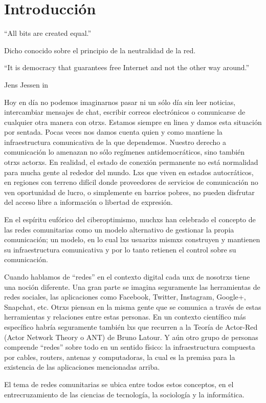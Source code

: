 \section{Introducción}

\epigraph{``All bits are created equal.''}{Dicho conocido sobre el principio de la neutralidad de la red.}
\epigraph{``It is democracy that guarantees free Internet and not the other way around.''}{Jens Jessen in~\autocite{Rieder2012}}

Hoy en día no podemos imaginarnos pasar ni un sólo día sin leer noticias, intercambiar mensajes de chat, escribir correos electrónicos o comunicarse de cualquier otra manera con otrxs.
Estamos siempre en linea y damos esta situación por sentada.
Pocas veces nos damos cuenta quien y como mantiene la infraestructura comunicativa de la que dependemos.
Nuestro derecho a comunicación lo amenazan no sólo regímenes antidemocráticos, sino también otrxs actorxs.
En realidad, el estado de conexión permanente no está normalidad para mucha gente al rededor del mundo.
Lxs que viven en estados autocráticos, en regiones con terreno difícil donde proveedores de servicios de comunicación no ven oportunidad de lucro, o simplemente en barrios pobres, no pueden disfrutar del acceso libre a información o libertad de expresión.

En el espíritu eufórico del ciberoptimismo, muchxs han celebrado el concepto de las redes comunitarias como un modelo alternativo de gestionar la propia comunicación;
un modelo, en lo cual lxs usuarixs mismxs construyen y mantienen su infraestructura comunicativa y por lo tanto retienen el control sobre su comunicación.

Cuando hablamos de ``redes'' en el contexto digital cada unx de nosotrxs tiene una noción diferente.
Una gran parte se imagina seguramente las herramientas de redes sociales, las aplicaciones como Facebook, Twitter, Instagram, Google+, Snapchat, etc.
Otrxs piensan en la misma gente que se comunica a través de estas herramientas y relaciones entre estas personas.
En un contexto científico más específico habría seguramente también lxs que recurren a la Teoría de Actor-Red (Actor Network Theory o ANT) de Bruno Latour.
Y aún otro grupo de personas comprende ``redes'' sobre todo en un sentido físico: la infraestructura compuesta por cables, routers, antenas y computadoras, la cual es la premisa para la existencia de las aplicaciones mencionadas arriba.

El tema de redes comunitarias se ubica entre todos estos conceptos, en el entrecruzamiento de las ciencias de tecnología, la sociología y la informática.


